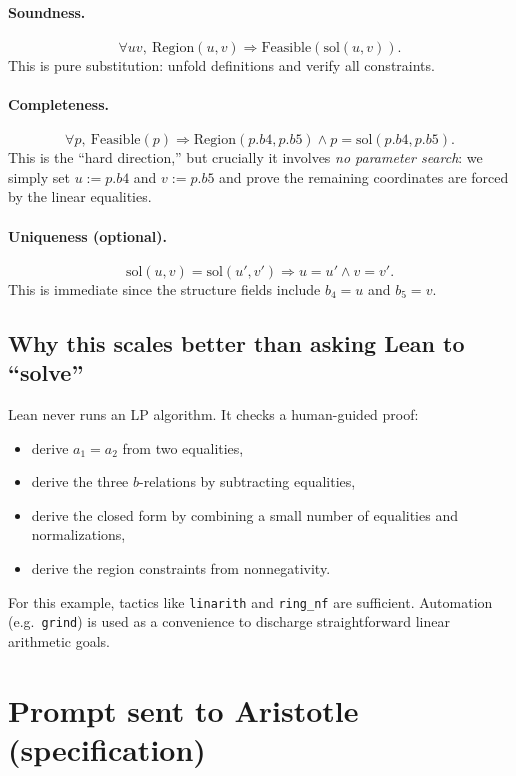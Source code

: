 \documentclass[11pt]{article}
\begin{document}
\paragraph{Soundness.}
\[
\forall u v,\ \mathrm{Region}(u,v)\Rightarrow \mathrm{Feasible}(\mathrm{sol}(u,v)).
\]
This is pure substitution: unfold definitions and verify all constraints.

\paragraph{Completeness.}
\[
\forall p,\ \mathrm{Feasible}(p)\Rightarrow \mathrm{Region}(p.b4,p.b5)\wedge p=\mathrm{sol}(p.b4,p.b5).
\]
This is the ``hard direction,'' but crucially it involves \emph{no parameter search}:
we simply set $u:=p.b4$ and $v:=p.b5$ and prove the remaining coordinates are forced by the linear equalities.

\paragraph{Uniqueness (optional).}
\[
\mathrm{sol}(u,v)=\mathrm{sol}(u',v') \Rightarrow u=u'\wedge v=v'.
\]
This is immediate since the structure fields include $b_4=u$ and $b_5=v$.

\subsection{Why this scales better than asking Lean to ``solve''}

Lean never runs an LP algorithm. It checks a human-guided proof:
\begin{itemize}
\item derive $a_1=a_2$ from two equalities,
\item derive the three $b$-relations by subtracting equalities,
\item derive the closed form by combining a small number of equalities and normalizations,
\item derive the region constraints from nonnegativity.
\end{itemize}
For this example, tactics like \texttt{linarith} and \texttt{ring\_nf} are sufficient.
Automation (e.g.\ \texttt{grind}) is used as a convenience to discharge straightforward linear arithmetic goals.

\section{Prompt sent to Aristotle (specification)}
\end{document}

